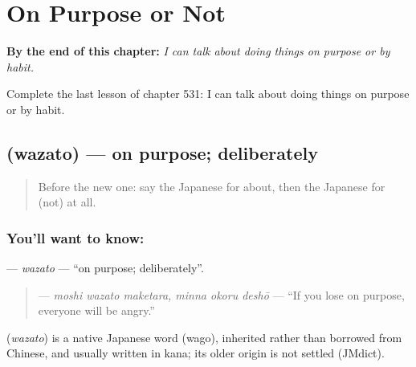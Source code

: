 
\chapter{On Purpose or Not}
\label{ch:ja-on-purpose-or-not}

\begin{chapteropening}
\textbf{By the end of this chapter:} \emph{I can talk about doing things on purpose or by habit.}

Complete the last lesson of chapter 531: I can talk about doing things on purpose or by habit.
\end{chapteropening}

\section[\texorpdfstring{\ja{わざと} (wazato)}{わざと (wazato)}]{ (wazato) — on purpose; deliberately}

\label{lesson:JA-C531-wazato}



\begin{quote}
Before the new one: say the Japanese for about, then the Japanese for (not) at all.
\end{quote}

\subsection*{You'll want to know: }
\textbf{} — \emph{wazato} — \textquotedblleft{}on purpose; deliberately\textquotedblright{}.

\begin{quote}
\textbf{   } — \emph{moshi wazato maketara, minna okoru deshō} — \textquotedblleft{}If you lose on purpose, everyone will be angry.\textquotedblright{}
\end{quote}

\begin{cousinweb}
\textbf{} (\emph{wazato}) is a native Japanese word (wago), inherited rather than borrowed from Chinese, and usually written in kana; its older origin is not settled (JMdict).
\end{cousinweb}

